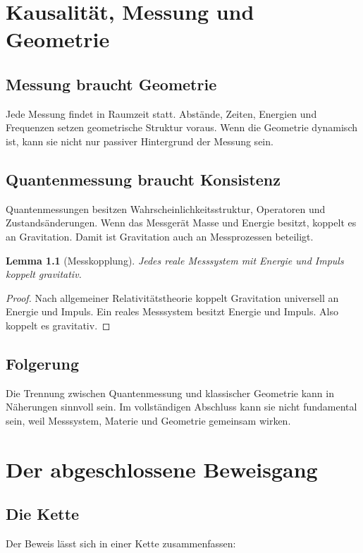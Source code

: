 \documentclass[11pt,a4paper]{book}
\newtheorem{lemma}{Lemma}[chapter]
\theoremstyle{remark}
\begin{document}
\chapter{Kausalität, Messung und Geometrie}
\section{Messung braucht Geometrie}
Jede Messung findet in Raumzeit statt. Abstände, Zeiten, Energien und Frequenzen setzen geometrische Struktur voraus. Wenn die Geometrie dynamisch ist, kann sie nicht nur passiver Hintergrund der Messung sein.

\section{Quantenmessung braucht Konsistenz}
Quantenmessungen besitzen Wahrscheinlichkeitsstruktur, Operatoren und Zustandsänderungen. Wenn das Messgerät Masse und Energie besitzt, koppelt es an Gravitation. Damit ist Gravitation auch an Messprozessen beteiligt.

\begin{lemma}[Messkopplung]
Jedes reale Messsystem mit Energie und Impuls koppelt gravitativ.
\end{lemma}

\begin{proof}
Nach allgemeiner Relativitätstheorie koppelt Gravitation universell an Energie und Impuls. Ein reales Messsystem besitzt Energie und Impuls. Also koppelt es gravitativ.
\end{proof}

\section{Folgerung}
Die Trennung zwischen Quantenmessung und klassischer Geometrie kann in Näherungen sinnvoll sein. Im vollständigen Abschluss kann sie nicht fundamental sein, weil Messsystem, Materie und Geometrie gemeinsam wirken.

\chapter{Der abgeschlossene Beweisgang}
\section{Die Kette}
Der Beweis lässt sich in einer Kette zusammenfassen:
\end{document}

